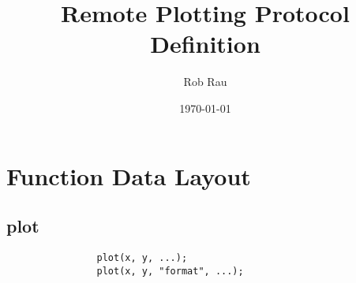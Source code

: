 \documentclass[12pt,parskip=full]{article}
\numberwithin{subsection}{section}
\begin{document}
	\vspace{-4ex}
	\title{Remote Plotting Protocol Definition\vspace{-3.5ex}}
	\author{Rob Rau\vspace{-4ex}}
	\date{\today\vspace{-4ex}}
	\maketitle
	
	\section{Function Data Layout}
	
		\subsection{plot}
			\begin{lstlisting}
				plot(x, y, ...);
				plot(x, y, "format", ...);
			\end{lstlisting}
\end{document}
